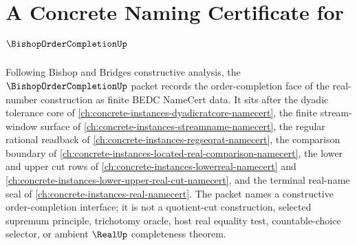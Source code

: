 \chapter{A Concrete Naming Certificate for $\BishopOrderCompletionUp$}
\label{ch:concrete-instances-bishop-order-completion-namecert}

Following Bishop and Bridges constructive analysis, the $\BishopOrderCompletionUp$ packet records the order-completion face of the real-number construction as finite BEDC NameCert data. It sits after the dyadic tolerance core of \autoref{ch:concrete-instances-dyadicratcore-namecert}, the finite stream-window surface of \autoref{ch:concrete-instances-streamname-namecert}, the regular rational readback of \autoref{ch:concrete-instances-regseqrat-namecert}, the comparison boundary of \autoref{ch:concrete-instances-located-real-comparison-namecert}, the lower and upper cut rows of \autoref{ch:concrete-instances-lowerreal-namecert} and \autoref{ch:concrete-instances-lower-upper-real-cut-namecert}, and the terminal real-name seal of \autoref{ch:concrete-instances-real-namecert}. The packet names a constructive order-completion interface; it is not a quotient-cut construction, selected supremum principle, trichotomy oracle, host real equality test, countable-choice selector, or ambient $\RealUp$ completeness theorem.

